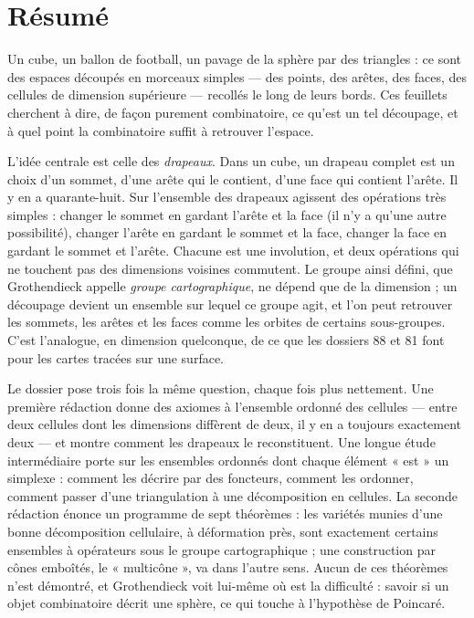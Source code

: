 \documentclass[11pt,a4paper]{article}
\begin{document}
\section*{Résumé}

\begin{resume}
Un cube, un ballon de football, un pavage de la sphère par des triangles :
ce sont des espaces découpés en morceaux simples --- des points, des arêtes,
des faces, des cellules de dimension supérieure --- recollés le long de leurs
bords. Ces feuillets cherchent à dire, de façon purement combinatoire, ce
qu'est un tel découpage, et à quel point la combinatoire suffit à retrouver
l'espace.

L'idée centrale est celle des \emph{drapeaux}. Dans un cube, un drapeau
complet est un choix d'un sommet, d'une arête qui le contient, d'une face qui
contient l'arête. Il y en a quarante-huit. Sur l'ensemble des drapeaux
agissent des opérations très simples : changer le sommet en gardant l'arête et
la face (il n'y a qu'une autre possibilité), changer l'arête en gardant le
sommet et la face, changer la face en gardant le sommet et l'arête. Chacune
est une involution, et deux opérations qui ne touchent pas des dimensions
voisines commutent. Le groupe ainsi défini, que Grothendieck appelle
\emph{groupe cartographique}, ne dépend que de la dimension ; un découpage
devient un ensemble sur lequel ce groupe agit, et l'on peut retrouver les
sommets, les arêtes et les faces comme les orbites de certains sous-groupes.
C'est l'analogue, en dimension quelconque, de ce que les dossiers 88 et 81
font pour les cartes tracées sur une surface.

Le dossier pose trois fois la même question, chaque fois plus nettement.
Une première rédaction donne des axiomes à l'ensemble ordonné des cellules ---
entre deux cellules dont les dimensions diffèrent de deux, il y en a toujours
exactement deux --- et montre comment les drapeaux le reconstituent. Une
longue étude intermédiaire porte sur les ensembles ordonnés dont chaque
élément « est » un simplexe : comment les décrire par des foncteurs, comment
les ordonner, comment passer d'une triangulation à une décomposition en
cellules. La seconde rédaction énonce un programme de sept théorèmes : les
variétés munies d'une bonne décomposition cellulaire, à déformation près,
sont exactement certains ensembles à opérateurs sous le groupe cartographique ;
une construction par cônes emboîtés, le « multicône », va dans l'autre sens.
Aucun de ces théorèmes n'est démontré, et Grothendieck voit lui-même où est
la difficulté : savoir si un objet combinatoire décrit une sphère, ce qui
touche à l'hypothèse de Poincaré.


\end{resume}
\end{document}

